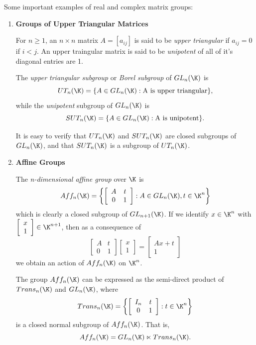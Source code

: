 \begin{examples}
  Some important examples of real and complex matrix groups:
  \begin{enumerate}
    \item {\bf Groups of Upper Triangular Matrices}

      For \(n\ge1\), an \(n\times n\) matrix \(A=[a_{ij}]\) is said to be {\it upper triangular}
      if \(a_{ij}=0\) if \(i<j\). An upper traingular matrix is said to be {\it unipotent} of all
      of it's diagonal entries are 1.

      The {\it upper triangular subgroup} or {\it Borel subgroup} of \(GL_n(\K)\) is
      \[ UT_n(\K)=\{A\in GL_n(\K):\text{A is upper triangular}\}, \]
      while the {\it unipotent} subgroup of \(GL_n(\K)\) is
      \[ SUT_n(\K)=\{A\in GL_n(\K):\text{A is unipotent}\}. \]

      It is easy to verify that \(UT_n(\K)\) and \(SUT_n(\K)\) are closed subgroups of \(GL_n(\K)\),
      and that \(SUT_n(\K)\) is a subgroup of \(UT_n(\K)\).
    \item {\bf Affine Groups}

      The {\it n-dimensional affine group} over \(\K\) is
      \[ Aff_n(\K) = \left\{ \left[\begin{array}{cc} A & t \\ 0 & 1 \end{array}\right]:A\in GL_n(\K), t\in \K^n\right\} \]
      which is clearly a closed subgroup of \(GL_{n+1}(\K)\). If we identify \(x\in\K^n\) with
      \(\left[\begin{array}{c} x \\ 1 \end{array}\right]\in\K^{n+1}\), then as a consequence of
      \[ 
        \left[\begin{array}{cc}
          A & t \\
          0 & 1 
        \end{array}\right]
        \left[\begin{array}{c} x \\ 1 \end{array}\right]
        =
        \left[\begin{array}{c} Ax+t \\ 1 \end{array}\right]
      \]
      we obtain an action of \(Aff_n(\K)\) on \(\K^n\).

      The group \(Aff_n(\K)\) can be expressed as the semi-direct product of \(Trans_n(\K)\)
      and \(GL_n(\K)\), where
      \[ Trans_n(\K) = \left\{ \left[\begin{array}{cc} I_n & t \\ 0 & 1 \end{array}\right]:t\in \K^n\right\} \]
      is a closed normal subgroup of \(Aff_n(\K)\). That is,
      \[ Aff_n(\K)=GL_n(\K)\ltimes Trans_n(\K). \]


\end{enumerate}
\end{examples}
